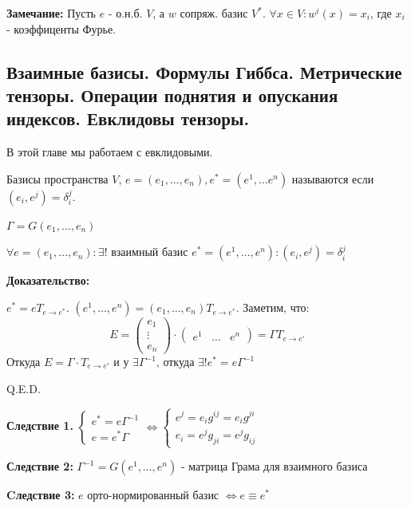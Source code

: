 \textbf{Замечание:} Пусть $e$ - о.н.б. $V$, а $w$ сопряж. базис $V^*$. $\forall x \in V: w^i(x) = x_i$, где $x_i$ - коэффиценты Фурье.


\pagebreak
\subsection{Взаимные базисы. Формулы Гиббса. Метрические тензоры. Операции поднятия и опускания индексов. Евклидовы тензоры.}

В этой главе мы работаем с евклидовыми.

 Базисы пространства $V$, $e = (e_1,\ldots,e_n), e^* = (e^1,\ldots e^n)$ называются  если $(e_i,e^j) = \delta_i^j$.

$\Gamma = G(e_1,\ldots ,e_n)$



$\forall e = (e_1,\ldots, e_n): \exists!$ взаимный базис $e^* = (e^1,\ldots, e^n): (e_i,e^j) = \delta_i^j$ 

\textbf{Доказательство:}

$e^* = e T_{e\rightarrow e^*}$. $(e^1,\ldots, e^n) = (e_1,\ldots, e_n)T_{e\rightarrow e^*}$. Заметим, что:
$$E = \begin{pmatrix}
    e_1\\
    \vdots\\
    e_n
\end{pmatrix} \cdot \begin{pmatrix}
    e^1 & \ldots & e^n
\end{pmatrix} = \Gamma T_{e\rightarrow e'}$$
Откуда $E = \Gamma \cdot T_{e\rightarrow e'}$ и у $\exists \Gamma^{-1}$, откуда $\exists! e^* =e \Gamma^{-1}$

\hfill Q.E.D.

\textbf{Следствие 1.}
$\begin{cases}
    e^* = e \Gamma^{-1}\\
    e = e^* \Gamma
\end{cases} \Leftrightarrow \begin{cases}
    e^j =e_i g^{ij}= e_i g^{ji}\\
    e_i = e^j g_{ji} = e^j g_{ij}
\end{cases}$

\textbf{Следствие 2:} $\Gamma^{-1} = G(e^1,\ldots, e^n)$ - матрица Грама для взаимного базиса

\textbf{Cледствие 3:} $e$ орто-нормированный базис $\Leftrightarrow e \equiv e^*$

